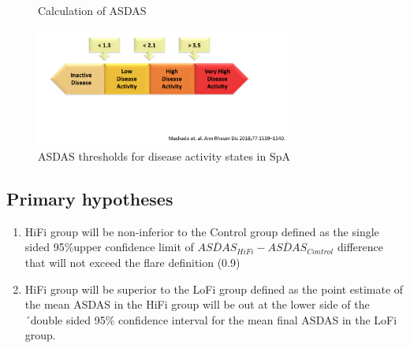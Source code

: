 \documentclass{article}\usepackage[]{graphicx}\usepackage[]{color}
\begin{document}
\begin{figure}
  \centering
  \caption {Calculation of ASDAS}
  \label{fig:asdas}
\end{figure}

\begin{figure}
  \centering
  \includegraphics[width=0.75\textwidth]{asdasactivity.png}
  \caption{ASDAS thresholds for disease activity states in SpA}
  \label{fig:asdasactivity}
\end{figure}

\subsection{Primary hypotheses}

\begin{enumerate}
\item HiFi group will be non-inferior to the Control group defined as the single sided 95\%upper confidence limit of  $\overline{ASDAS}_{HiFi} - \overline{ASDAS}_{Control}$ difference that will not exceed the flare definition (0.9)
\item HiFi group will be superior to the LoFi group defined as the point estimate of the mean ASDAS in the HiFi group will be out at the lower side of the ´double sided 95\% confidence interval for the mean final ASDAS in the LoFi group.
\end{enumerate}
\end{document}
